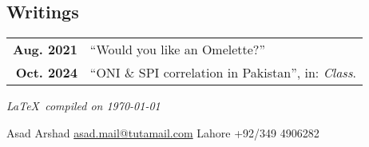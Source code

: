\documentclass[lighthipster]{hipstercv}
\newlength{\rightcolwidth}
\begin{document}
\begin{paracol}{2}
\begin{minipage}[t]{0.3\textwidth}
\end{minipage}\hfill
\begin{minipage}[t]{0.3\textwidth}
\section*{Writings}
\begin{tabular}{>{\footnotesize\bfseries}r >{\footnotesize}p{}}
    Aug. 2021 & ``Would you like an Omelette?''\\
    Oct. 2024 & ``ONI \& SPI correlation in Pakistan'', in: \emph{Class}. \\
\end{tabular}

\end{minipage}

\vspace{2em}

 \hfill
{} \hfill
{}\hfill
{} 

\begin{flushright}
    \small
    \textit{\LaTeX~compiled on \today}
\end{flushright}



\vspace{3em}


\vfill{} %
\setlength{\parindent}{0pt}
\begin{minipage}[t]{\rightcolwidth}
\begin{center}\fontfamily{\sfdefault}\selectfont \color{black!70}
{\small Asad Arshad  \protect\href{mailto:asad.mail!tutamail.com}{asad.mail@tutamail.com}  Lahore  +92/349 4906282 
}
\end{center}
\end{minipage}



\end{paracol}
\end{document}
